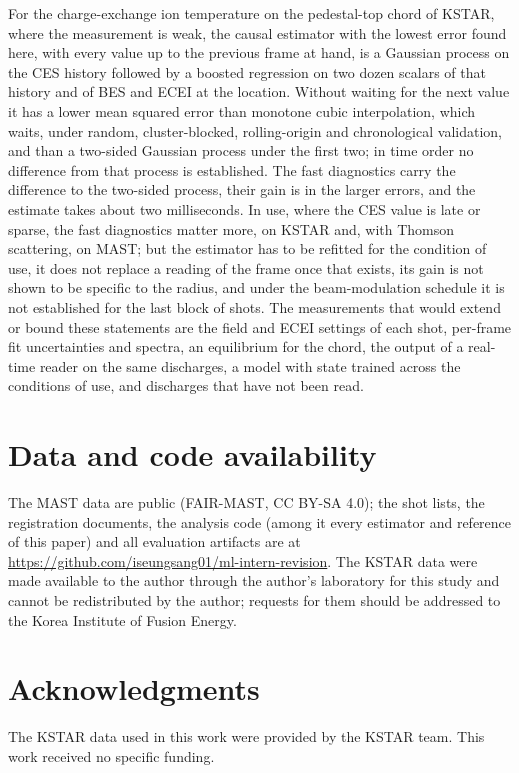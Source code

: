 \documentclass[11pt,a4paper]{article}
\begin{document}
For the charge-exchange ion temperature on the pedestal-top chord of KSTAR, where the
measurement is weak, the causal estimator with the lowest error found here, with every
value up to the previous frame at hand, is a Gaussian
process on the CES history followed by a boosted regression on two dozen scalars of that
history and of BES and ECEI at the location. Without waiting for the next value it has a
lower mean squared error than monotone cubic interpolation, which waits, under random,
cluster-blocked, rolling-origin and chronological validation, and than a two-sided
Gaussian process under the first two; in time order no difference from that process is
established. The
fast diagnostics carry the difference to the two-sided process, their gain is in the
larger errors, and the estimate takes about two milliseconds. In use, where the CES value
is late or sparse, the fast diagnostics matter more, on KSTAR and, with Thomson
scattering, on MAST; but the estimator has to be refitted for the condition of use, it
does not replace a reading of the frame once that exists, its gain is not shown to be
specific to the radius, and under the beam-modulation schedule it is not established for
the last block of shots. The measurements that would extend or bound these statements are
the field and ECEI settings of each shot, per-frame fit uncertainties and spectra, an
equilibrium for the chord, the output of a real-time reader on the same discharges, a
model with state trained across the conditions of use, and discharges that have not been
read.

\section*{Data and code availability}
The MAST data are public (FAIR-MAST, CC BY-SA 4.0); the shot lists, the registration
documents, the analysis code (among it every estimator and reference of this paper) and
all evaluation artifacts are at \url{https://github.com/iseungsang01/ml-intern-revision}.
The KSTAR data were made available to the author through the author's laboratory for this
study and cannot be redistributed by the author; requests for them should be addressed to
the Korea Institute of Fusion Energy.

\section*{Acknowledgments}
The KSTAR data used in this work were provided by the KSTAR team. This work received no
specific funding.



\end{document}
